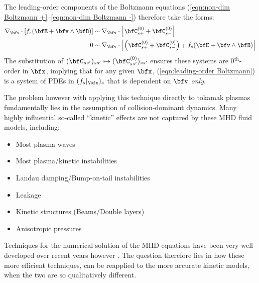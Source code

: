     The leading-order components of the Boltzmann equations (\ref{eqn:non-dim Boltzmann +}–\ref{eqn:non-dim Boltzmann -}) therefore take the forms:
    \begin{align}
        \nabla_{\bfv}\cdot[f_{s}(\bfE + \bfv\wedge\bfB)]  &\sim  \nabla_{\bfv}\cdot\left[\bfC_{s+}^{(0)} + \bfC_{s-}^{(0)}\right]  \\
        0  &\sim  \nabla_{\bfv}\cdot\left[\left(\bfC_{s+}^{(0)} + \bfC_{s-}^{(0)}\right) \mp f_{s}(\bfE + \bfv\wedge\bfB)\right]  \label{eqn:leading-order Boltzmann}
    \end{align}
    The substitution of $(\bfC_{ss'})_{ss'}  \mapsto  (\bfC_{ss'}^{(0)})_{ss'}$ ensures these systems are 0$^{\text{th}}$-order in $\bfx$, implying that for any given $\bfx$, (\ref{eqn:leading-order Boltzmann}) is a system of PDEs in $(f_{s}|_{\bfx})_{s}$ that is dependent on $\bfv$ \emph{only}.
    
    The problem however with applying this technique directly to tokamak plasmas fundamentally lies in the assumption of collision-dominant dynamics.  Many highly influential so-called ``kinetic'' effects are not captured by these MHD fluid models, including: 
    \begin{itemize}
        \item  Most plasma waves
        \item  Most plasma/kinetic instabilities
        \item  Landau damping/Bump-on-tail instabilities
        \item  Leakage
        \item  Kinetic structures (Beams/Double layers)
        \item  Anisotropic pressures
    \end{itemize}
    Techniques for the numerical solution of the MHD equations have been very well developed over recent years however . The question therefore lies in how these more efficient techniques, can be reapplied to the more accurate kinetic models, when the two are so qualitatively different.

    
